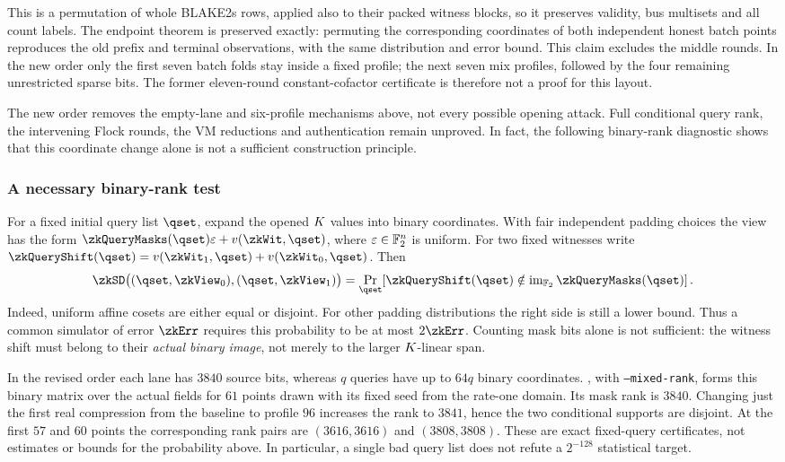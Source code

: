 This is a permutation of whole BLAKE2s rows, applied also to their packed witness blocks, so it preserves validity, bus multisets and all count labels. The endpoint theorem is preserved exactly: permuting the corresponding coordinates of both independent honest batch points reproduces the old prefix and terminal observations, with the same distribution and error bound. This claim excludes the middle rounds. In the new order only the first seven batch folds stay inside a fixed profile; the next seven mix profiles, followed by the four remaining unrestricted sparse bits. The former eleven-round constant-cofactor certificate is therefore not a proof for this layout.

The new order removes the empty-lane and six-profile mechanisms above, not every possible opening attack. Full conditional query rank, the intervening Flock rounds, the VM reductions and authentication remain unproved. In fact, the following binary-rank diagnostic shows that this coordinate change alone is not a sufficient construction principle.

\subsubsection{A necessary binary-rank test}

For a fixed initial query list $\qset$, expand the opened $K$ values into binary coordinates. With fair independent padding choices the view has the form $\zkQueryMasks(\qset)\varepsilon+v(\zkWit,\qset)$, where $\varepsilon\in\mathbb{F}_2^n$ is uniform. For two fixed witnesses write $\zkQueryShift(\qset)=v(\zkWit_1,\qset)+v(\zkWit_0,\qset)$. Then
\[
 \zkSD\bigl((\qset,\zkView_0),(\qset,\zkView_1)\bigr)
 =\Pr_{\qset}\!\left[
   \zkQueryShift(\qset)\notin\operatorname{im}_{\Ftwo}\zkQueryMasks(\qset)
 \right].
\]
Indeed, uniform affine cosets are either equal or disjoint. For other padding distributions the right side is still a lower bound. Thus a common simulator of error $\zkErr$ requires this probability to be at most $2\zkErr$. Counting mask bits alone is not sufficient: the witness shift must belong to their \emph{actual binary image}, not merely to the larger $K$-linear span.

In the revised order each lane has $3840$ source bits, whereas $q$ queries have up to $64q$ binary coordinates. , with \texttt{--mixed-rank}, forms this binary matrix over the actual fields for $61$ points drawn with its fixed seed from the rate-one domain. Its mask rank is $3840$. Changing just the first real compression from the baseline to profile $96$ increases the rank to $3841$, hence the two conditional supports are disjoint. At the first $57$ and $60$ points the corresponding rank pairs are $(3616,3616)$ and $(3808,3808)$. These are exact fixed-query certificates, not estimates or bounds for the probability above. In particular, a single bad query list does not refute a $2^{-128}$ statistical target.

